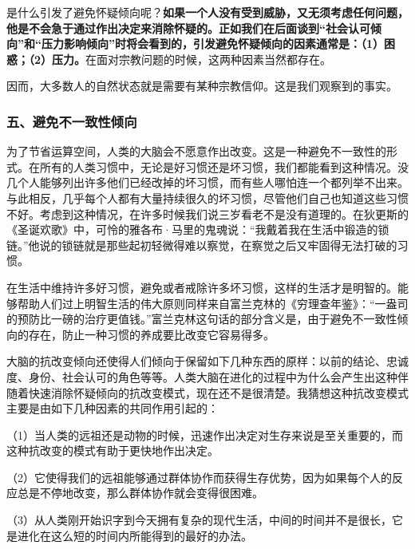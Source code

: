 是什么引发了避免怀疑倾向呢？\textbf{如果一个人没有受到威胁，又无须考虑任何问题，他是不会急于通过作出决定来消除怀疑的。正如我们在后面谈到“社会认可倾向”和“压力影响倾向”时将会看到的，引发避免怀疑倾向的因素通常是：（1）困惑；（2）压力。}在面对宗教问题的时候，这两种因素当然都存在。
\par

因而，大多数人的自然状态就是需要有某种宗教信仰。这是我们观察到的事实。
\par

\subsubsection*{五、避免不一致性倾向}

为了节省运算空间，人类的大脑会不愿意作出改变。这是一种避免不一致性的形式。在所有的人类习惯中，无论是好习惯还是坏习惯，我们都能看到这种情况。没几个人能够列出许多他们已经改掉的坏习惯，而有些人哪怕连一个都列举不出来。与此相反，几乎每个人都有大量持续很久的坏习惯，尽管他们自己也知道这些习惯不好。考虑到这种情况，在许多时候我们说三岁看老不是没有道理的。在狄更斯的《圣诞欢歌》中，可怜的雅各布·马里的鬼魂说：“我戴着我在生活中锻造的锁链。”他说的锁链就是那些起初轻微得难以察觉，在察觉之后又牢固得无法打破的习惯。
\par

在生活中维持许多好习惯，避免或者戒除许多坏习惯，这样的生活才是明智的。能够帮助人们过上明智生活的伟大原则同样来自富兰克林的《穷理查年鉴》：“一盎司的预防比一磅的治疗更值钱。”富兰克林这句话的部分含义是，由于避免不一致性倾向的存在，防止一种习惯的养成要比改变它容易得多。
\par

大脑的抗改变倾向还使得人们倾向于保留如下几种东西的原样：以前的结论、忠诚度、身份、社会认可的角色等等。人类大脑在进化的过程中为什么会产生出这种伴随着快速消除怀疑倾向的抗改变模式，现在还不是很清楚。我猜想这种抗改变模式主要是由如下几种因素的共同作用引起的：
\par

（1）当人类的远祖还是动物的时候，迅速作出决定对生存来说是至关重要的，而这种抗改变的模式有助于更快地作出决定。
\par

（2）它使得我们的远祖能够通过群体协作而获得生存优势，因为如果每个人的反应总是不停地改变，那么群体协作就会变得很困难。
\par

（3）从人类刚开始识字到今天拥有复杂的现代生活，中间的时间并不是很长，它是进化在这么短的时间内所能得到的最好的办法。
\par

